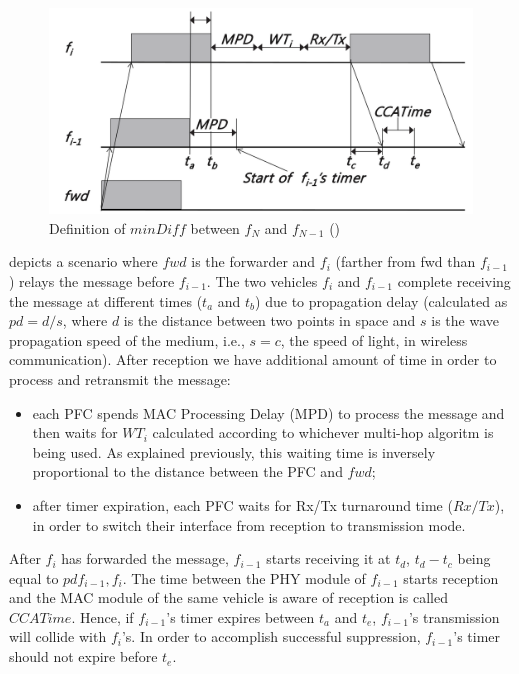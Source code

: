 			\begin{figure}[H]
				\centering
				\includegraphics[width=\textwidth]{immagini/minDiff}
				\caption{Definition of $minDiff$ between $f_N$ and $f_{N-1}$ (\cite{6906275})}
				\label{fig:minDiff}
			\end{figure}
		
			 depicts a scenario where $fwd$ is the forwarder and $f_i$ (farther from fwd than $f_{i-1}$) relays the message before $f_{i-1}$. The two vehicles $f_i$ and $f_{i-1}$ complete receiving the message at different times ($t_a$ and $t_b$) due to propagation delay (calculated as $pd = d / s$, where $d$ is the distance between two points in space and $s$ is the wave propagation speed of the medium, i.e., $s=c$, the speed of light, in wireless communication). After reception we have additional amount of time in order to process and retransmit the message:
			\begin{itemize}
				\item each PFC spends MAC Processing Delay (MPD) to process the message and then waits for $WT_i$ calculated according to whichever multi-hop algoritm is being used. As explained previously, this waiting time is inversely proportional to the distance between the PFC and $fwd$;
				\item after timer expiration, each PFC waits for Rx/Tx turnaround time ($Rx/Tx$), in order to switch their interface from reception to transmission mode.
			\end{itemize}
			After $f_i$ has forwarded the message, $f_{i-1}$ starts receiving it at $t_d$, $t_d-t_c$  being equal to $pd{f_{i-1}, f_i}$. The time between the PHY module of $f_{i-1}$ starts reception and the MAC module of the same vehicle is aware of reception is called $CCATime$. Hence, if $f_{i-1}$'s timer expires between $t_a$ and $t_e$, $f_{i-1}$'s transmission will collide with $f_i$'s. In order to accomplish successful suppression, $f_{i-1}$'s timer should not expire  before $t_e$. 
			
